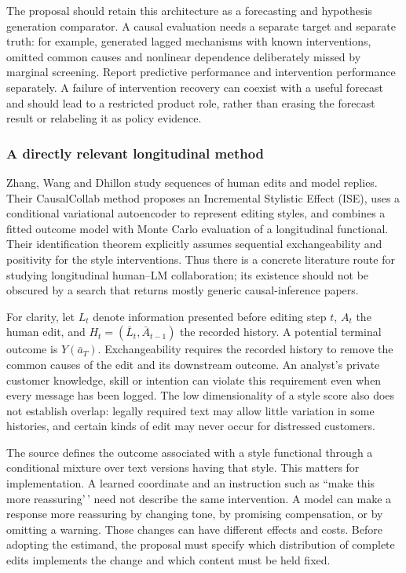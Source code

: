 The proposal should retain this architecture as a forecasting and
hypothesis generation comparator. A causal evaluation needs a separate
target and separate truth: for example, generated lagged mechanisms with
known interventions, omitted common causes and nonlinear dependence
deliberately missed by marginal screening. Report predictive performance
and intervention performance separately. A failure of intervention
recovery can coexist with a useful forecast and should lead to a
restricted product role, rather than erasing the forecast result or
relabeling it as policy evidence.

\hypertarget{a-directly-relevant-longitudinal-method}{%
\subsubsection{A directly relevant longitudinal
method}\label{a-directly-relevant-longitudinal-method}}

Zhang, Wang and Dhillon study sequences of human edits and model
replies. Their CausalCollab method proposes an Incremental Stylistic
Effect (ISE), uses a conditional variational autoencoder to represent
editing styles, and combines a fitted outcome model with Monte Carlo
evaluation of a longitudinal functional. Their identification theorem
explicitly assumes sequential exchangeability and positivity for the
style interventions. Thus there is a concrete literature route for
studying longitudinal human--LM collaboration; its existence should not
be obscured by a search that returns mostly generic causal-inference
papers. \cite{exec13_census_collaboration}

For clarity, let \(L_t\) denote information presented before editing
step \(t\), \(A_t\) the human edit, and \(H_t=(\bar L_t,\bar A_{t-1})\)
the recorded history. A potential terminal outcome is \(Y(\bar a_T)\).
Exchangeability requires the recorded history to remove the common
causes of the edit and its downstream outcome. An analyst's private
customer knowledge, skill or intention can violate this requirement even
when every message has been logged. The low dimensionality of a style
score also does not establish overlap: legally required text may allow
little variation in some histories, and certain kinds of edit may never
occur for distressed customers.

The source defines the outcome associated with a style functional
through a conditional mixture over text versions having that style. This
matters for implementation. A learned coordinate and an instruction such
as ``make this more reassuring'\,' need not describe the same
intervention. A model can make a response more reassuring by changing
tone, by promising compensation, or by omitting a warning. Those changes
can have different effects and costs. Before adopting the estimand, the
proposal must specify which distribution of complete edits implements
the change and which content must be held fixed.

